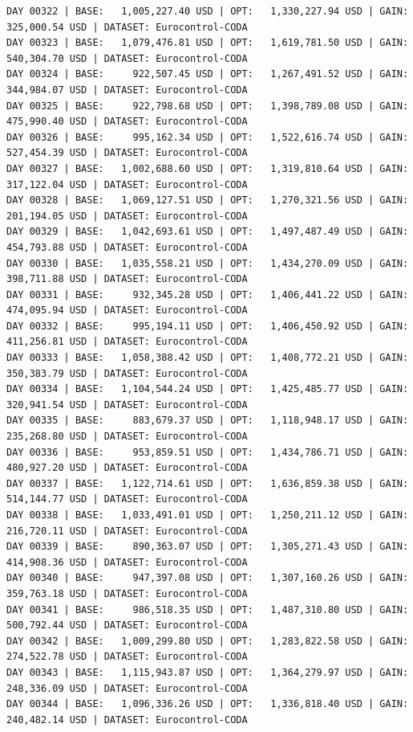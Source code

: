 \documentclass[11pt,a4paper]{article}
\begin{document}
\begin{verbatim}
DAY 00322 | BASE:   1,005,227.40 USD | OPT:   1,330,227.94 USD | GAIN: 325,000.54 USD | DATASET: Eurocontrol-CODA
DAY 00323 | BASE:   1,079,476.81 USD | OPT:   1,619,781.50 USD | GAIN: 540,304.70 USD | DATASET: Eurocontrol-CODA
DAY 00324 | BASE:     922,507.45 USD | OPT:   1,267,491.52 USD | GAIN: 344,984.07 USD | DATASET: Eurocontrol-CODA
DAY 00325 | BASE:     922,798.68 USD | OPT:   1,398,789.08 USD | GAIN: 475,990.40 USD | DATASET: Eurocontrol-CODA
DAY 00326 | BASE:     995,162.34 USD | OPT:   1,522,616.74 USD | GAIN: 527,454.39 USD | DATASET: Eurocontrol-CODA
DAY 00327 | BASE:   1,002,688.60 USD | OPT:   1,319,810.64 USD | GAIN: 317,122.04 USD | DATASET: Eurocontrol-CODA
DAY 00328 | BASE:   1,069,127.51 USD | OPT:   1,270,321.56 USD | GAIN: 201,194.05 USD | DATASET: Eurocontrol-CODA
DAY 00329 | BASE:   1,042,693.61 USD | OPT:   1,497,487.49 USD | GAIN: 454,793.88 USD | DATASET: Eurocontrol-CODA
DAY 00330 | BASE:   1,035,558.21 USD | OPT:   1,434,270.09 USD | GAIN: 398,711.88 USD | DATASET: Eurocontrol-CODA
DAY 00331 | BASE:     932,345.28 USD | OPT:   1,406,441.22 USD | GAIN: 474,095.94 USD | DATASET: Eurocontrol-CODA
DAY 00332 | BASE:     995,194.11 USD | OPT:   1,406,450.92 USD | GAIN: 411,256.81 USD | DATASET: Eurocontrol-CODA
DAY 00333 | BASE:   1,058,388.42 USD | OPT:   1,408,772.21 USD | GAIN: 350,383.79 USD | DATASET: Eurocontrol-CODA
DAY 00334 | BASE:   1,104,544.24 USD | OPT:   1,425,485.77 USD | GAIN: 320,941.54 USD | DATASET: Eurocontrol-CODA
DAY 00335 | BASE:     883,679.37 USD | OPT:   1,118,948.17 USD | GAIN: 235,268.80 USD | DATASET: Eurocontrol-CODA
DAY 00336 | BASE:     953,859.51 USD | OPT:   1,434,786.71 USD | GAIN: 480,927.20 USD | DATASET: Eurocontrol-CODA
DAY 00337 | BASE:   1,122,714.61 USD | OPT:   1,636,859.38 USD | GAIN: 514,144.77 USD | DATASET: Eurocontrol-CODA
DAY 00338 | BASE:   1,033,491.01 USD | OPT:   1,250,211.12 USD | GAIN: 216,720.11 USD | DATASET: Eurocontrol-CODA
DAY 00339 | BASE:     890,363.07 USD | OPT:   1,305,271.43 USD | GAIN: 414,908.36 USD | DATASET: Eurocontrol-CODA
DAY 00340 | BASE:     947,397.08 USD | OPT:   1,307,160.26 USD | GAIN: 359,763.18 USD | DATASET: Eurocontrol-CODA
DAY 00341 | BASE:     986,518.35 USD | OPT:   1,487,310.80 USD | GAIN: 500,792.44 USD | DATASET: Eurocontrol-CODA
DAY 00342 | BASE:   1,009,299.80 USD | OPT:   1,283,822.58 USD | GAIN: 274,522.78 USD | DATASET: Eurocontrol-CODA
DAY 00343 | BASE:   1,115,943.87 USD | OPT:   1,364,279.97 USD | GAIN: 248,336.09 USD | DATASET: Eurocontrol-CODA
DAY 00344 | BASE:   1,096,336.26 USD | OPT:   1,336,818.40 USD | GAIN: 240,482.14 USD | DATASET: Eurocontrol-CODA

\end{verbatim}
\end{document}
